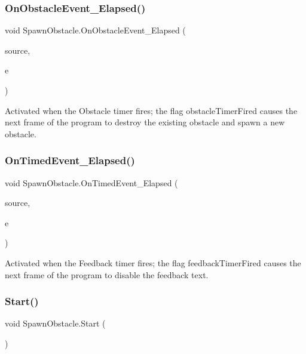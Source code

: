 \subsubsection{\texorpdfstring{On\+Obstacle\+Event\+\_\+\+Elapsed()}{OnObstacleEvent\_Elapsed()}}
{\footnotesize\ttfamily void Spawn\+Obstacle.\+On\+Obstacle\+Event\+\_\+\+Elapsed (\begin{DoxyParamCaption}\item[{System.\+Object}]{source,  }\item[{System.\+Timers.\+Elapsed\+Event\+Args}]{e }\end{DoxyParamCaption})\hspace{0.3cm}{\ttfamily [private]}}

Activated when the Obstacle timer fires; the flag obstacle\+Timer\+Fired causes the next frame of the program to destroy the existing obstacle and spawn a new obstacle. \mbox{\label{class_spawn_obstacle_a4bb922374a8cace9764162b060d73ad7}} 
\subsubsection{\texorpdfstring{On\+Timed\+Event\+\_\+\+Elapsed()}{OnTimedEvent\_Elapsed()}}
{\footnotesize\ttfamily void Spawn\+Obstacle.\+On\+Timed\+Event\+\_\+\+Elapsed (\begin{DoxyParamCaption}\item[{System.\+Object}]{source,  }\item[{System.\+Timers.\+Elapsed\+Event\+Args}]{e }\end{DoxyParamCaption})\hspace{0.3cm}{\ttfamily [private]}}

Activated when the Feedback timer fires; the flag feedback\+Timer\+Fired causes the next frame of the program to disable the feedback text. \mbox{\label{class_spawn_obstacle_ac1cc195163c333ad19d7b234fa6fb717}} 
\subsubsection{\texorpdfstring{Start()}{Start()}}
{\footnotesize\ttfamily void Spawn\+Obstacle.\+Start (\begin{DoxyParamCaption}{ }\end{DoxyParamCaption})\hspace{0.3cm}{\ttfamily [private]}}

